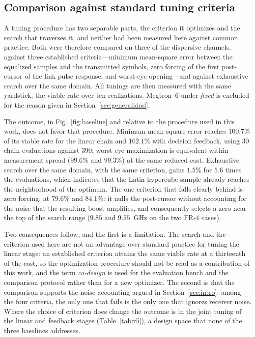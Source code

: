 \documentclass[twocolumn]{USG}
\begin{document}
\subsection{Comparison against standard tuning criteria}
\label{sec:baseline}
A tuning procedure has two separable parts, the criterion it optimizes and the
search that traverses it, and neither had been measured here against common
practice. Both were therefore compared on three of the dispersive channels,
against three established criteria---minimum mean-square error between the
equalized samples and the transmitted symbols, zero forcing of the first
post-cursor of the link pulse response, and worst-eye opening---and against
exhaustive search over the same domain. All tunings are then measured with the
same yardstick, the viable rate over ten realizations. Megtron~6 under
\textit{fixed} is excluded for the reason given in
Section~\ref{sec:generalidad}.

The outcome, in Fig.~\ref{fig:baseline} and relative to the procedure used in
this work, does not favor that procedure. Minimum mean-square error reaches
$100.7\%$ of its viable rate for the linear chain and $102.1\%$ with decision
feedback, using $30$ chain evaluations against $390$; worst-eye maximization is
equivalent within measurement spread ($99.6\%$ and $99.3\%$) at the same
reduced cost. Exhaustive search over the same domain, with the same criterion,
gains $1.5\%$ for $5.6$ times the evaluations, which indicates that the Latin
hypercube sample already reaches the neighborhood of the optimum. The one
criterion that falls clearly behind is zero forcing, at $79.6\%$ and $84.1\%$:
it nulls the post-cursor without accounting for the noise that the resulting
boost amplifies, and consequently selects a zero near the top of the search
range ($9.85$ and $9.55$~GHz on the two FR-4 cases).

Two consequences follow, and the first is a limitation. The search and the
criterion used here are not an advantage over standard practice for tuning the
linear stage: an established criterion attains the same viable rate at a
thirteenth of the cost, so the optimization procedure should not be read as a
contribution of this work, and the term \emph{co-design} is used for the
evaluation bench and the comparison protocol rather than for a new optimizer.
The second is that the comparison supports the noise accounting argued in
Section~\ref{sec:intro}: among the four criteria, the only one that fails is
the only one that ignores receiver noise. Where the choice of criterion does
change the outcome is in the joint tuning of the linear and feedback stages
(Table~\ref{tab:r5}), a design space that none of the three baselines
addresses.
\end{document}
